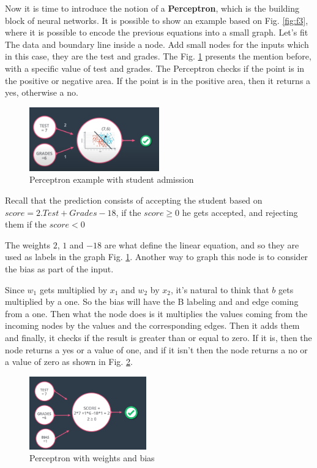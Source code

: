 \documentclass{article}
\begin{document}
Now it is time to introduce the notion of a \textbf{Perceptron}, which is the building block of neural networks. It is possible to show an example based on Fig. \ref{fig:f3}, where it is possible to encode the previous equations into a small graph. Let's fit The data and boundary line inside a node. Add small nodes for the inputs which in this case, they are the test and grades. The Fig. \ref{fig:f6} presents the mention before, with a specific value of test and grades. The Perceptron checks if the point is in the positive or negative area. If the point is in the positive area, then it returns a yes, otherwise a no.

\begin{figure}[ht]
    \centering
    \includegraphics[width=0.5\textwidth,height=0.5\textheight,keepaspectratio]{images/perceptron_1.PNG}
    \captionsetup{justification=centering}
    \caption{Perceptron example with student admission}
    \label{fig:f6}
\end{figure}

Recall that the prediction consists of accepting the student based on \(score =2.Test + Grades - 18\), if the \( score \geq 0\) he gets accepted, and rejecting them if the \(score < 0\)

The weights \(2\), \(1\) and \(-18\) are what define the linear equation, and so they are used as labels in the graph Fig. \ref{fig:f6}. Another way to graph this node is to consider the bias as part of the input.

Since \(w_1\) gets multiplied by \(x_1\) and \(w_2\) by \(x_2\), it's natural to think that \(b\) gets multiplied by a one. So the bias will have the B labeling and and edge coming from a one. Then what the node does is it multiplies the values coming from the incoming nodes by the values and the corresponding edges. Then it adds them and finally, it checks if the result is greater than or equal to zero. If it is, then the node returns a yes or a value of one, and if it isn't then the node returns a no or a value of zero as shown in Fig. \ref{fig:f7}.

\begin{figure}[ht]
    \centering
    \includegraphics[width=0.45\textwidth,height=0.45\textheight,keepaspectratio]{images/perceptron_2.PNG}
    \captionsetup{justification=centering}
    \caption{Perceptron with weights and bias}
    \label{fig:f7}
\end{figure}
\end{document}
